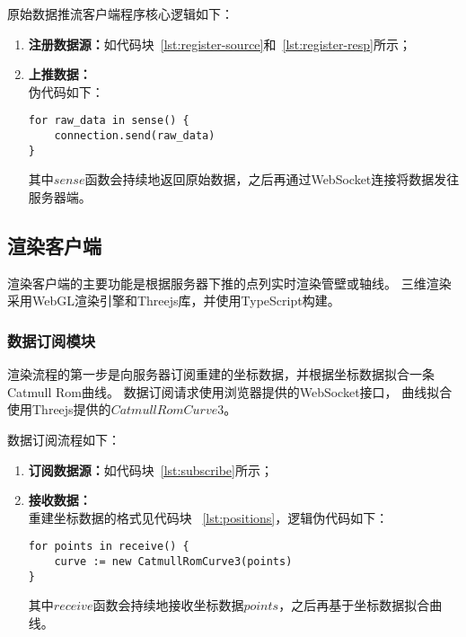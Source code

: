 原始数据推流客户端程序核心逻辑如下：

\begin{enumerate}
\item \textbf{注册数据源：}如代码块~\ref{lst:register-source}和~\ref{lst:register-resp}所示；
\item \textbf{上推数据：} \\
伪代码如下：

\begin{lstlisting}[caption={上推数据}]
for raw_data in sense() {
    connection.send(raw_data)
}
\end{lstlisting}

其中$sense$函数会持续地返回原始数据，之后再通过WebSocket连接将数据发往服务器端。

\end{enumerate}

\subsection{渲染客户端}

渲染客户端的主要功能是根据服务器下推的点列实时渲染管壁或轴线。
三维渲染采用WebGL渲染引擎和Threejs库，并使用TypeScript构建。

\subsubsection{数据订阅模块}
渲染流程的第一步是向服务器订阅重建的坐标数据，并根据坐标数据拟合一条Catmull Rom曲线。
数据订阅请求使用浏览器提供的WebSocket接口\cite{mdn-websocket}，
曲线拟合使用Threejs提供的$CatmullRomCurve3$。

数据订阅流程如下：

\begin{enumerate}
\item \textbf{订阅数据源：}如代码块~\ref{lst:subscribe}所示；
\item \textbf{接收数据：} \\
重建坐标数据的格式见代码块 ~\ref{lst:positions}，逻辑伪代码如下：

\begin{lstlisting}[caption={订阅数据}]
for points in receive() {
    curve := new CatmullRomCurve3(points)
}
\end{lstlisting}

其中$receive$函数会持续地接收坐标数据$points$，之后再基于坐标数据拟合曲线。

\end{enumerate}

